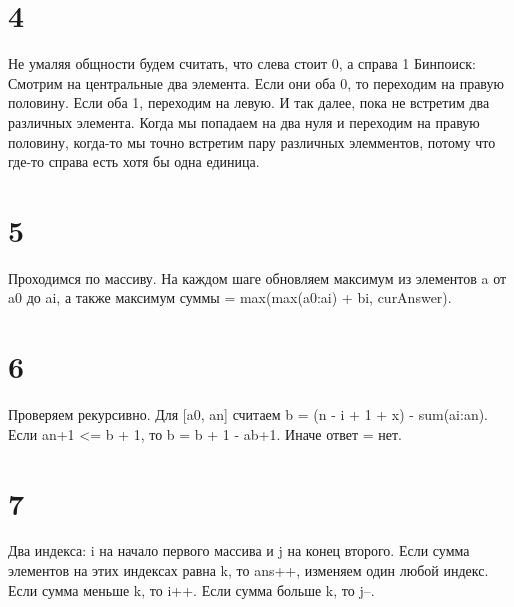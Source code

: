 \documentclass[12pt]{extarticle}
\begin{document}
\section*{4}
Не умаляя общности будем считать, что слева стоит 0, а справа 1\newline
Бинпоиск: \newline
Смотрим на центральные два элемента. Если они оба 0, то переходим на правую половину. Если оба 1, переходим на левую. И так далее, пока не встретим два различных элемента.\newline
Когда мы попадаем на два нуля и переходим на правую половину, когда-то мы точно встретим пару различных элемментов, потому что где-то справа есть хотя бы одна единица.

\section*{5}
Проходимся по массиву. На каждом шаге обновляем максимум из элементов a от a0 до ai, а также максимум суммы = max(max(a0:ai) + bi, curAnswer).

\section*{6}
Проверяем рекурсивно. Для [a0, an] считаем b = (n - i + 1 + x) - sum(ai:an). Если an+1 <= b + 1, то b = b + 1 - ab+1. Иначе ответ = нет.

\section*{7}
Два индекса: i на начало первого массива и j на конец второго.\newline
Если сумма элементов на этих индексах равна k, то ans++, изменяем один любой индекс.
Если сумма меньше k, то i++.
Если сумма больше k, то j--.
\end{document}
